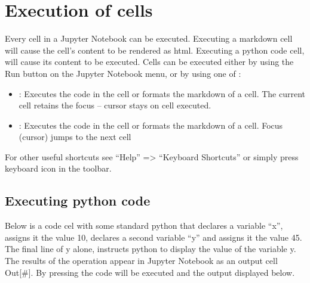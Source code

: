 \documentclass[letterpaper,10pt,english]{jupyterBook}
\begin{document}
\section{Execution of cells}
\label{\detokenize{content/04_PythonEssentials/Intro_Jupyter_notebook:execution-of-cells}}
\sphinxAtStartPar
Every cell in a Jupyter Notebook can be executed. Executing a markdown cell will cause the cell’s content to be rendered as html.  Executing a python code cell, will cause its content to be executed. Cells can be executed either by using the Run button on the Jupyter Notebook menu, or by using one of :
\begin{itemize}
\item {} 
\sphinxAtStartPar
{}: Executes the code in the cell or formats the markdown of a cell.  The current cell retains the focus – cursor stays on cell executed.

\item {} 
\sphinxAtStartPar
{}: Executes the code in the cell or formats the markdown of a cell. Focus (cursor) jumps to the next cell

\end{itemize}

\sphinxAtStartPar
For other useful shortcuts see “Help” => “Keyboard Shortcuts” or simply press keyboard icon in the toolbar.


\subsection{Executing python code}
\label{\detokenize{content/04_PythonEssentials/Intro_Jupyter_notebook:executing-python-code}}
\sphinxAtStartPar
Below is a code cel with some standard python that declares a variable “x”, assigns it the value 10, declares a second variable “y” and assigns it the value 45.  The final line of y alone, instructs python to display the value of the variable y.  The results of the operation appear in Jupyter Notebook as an output cell Out{[}\#{]}.  By pressing  the code will be executed and the output displayed below.
\end{document}

